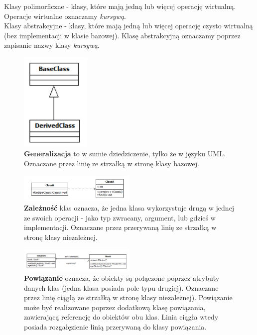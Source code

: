 \documentclass[a4paper,12pt,oneside]{book}
\begin{document}
                Klasy polimorficzne - klasy, które mają jedną lub więcej operację wirtualną. Operacje wirtualne oznaczamy \textit{kursywą}.\\
                Klasy abstrakcyjne - klasy, które mają jedną lub więcej operację czysto wirtualną (bez implementacji w klasie bazowej). Klasę abstrakcyjną oznaczamy poprzez zapisanie nazwy klasy \textit{kursywą}.\\
                \begin{figure}[H]
                    \centering
                    \includegraphics[width=0.3\textwidth]{images/class_inheritance.jpg}
                    \caption{\textbf{Generalizacja} to w sumie dziedziczenie, tylko że w języku UML. Oznaczane przez linię ze strzałką w stronę klasy bazowej.}
                    \label{fig:twojastara35}
                \end{figure}
                \begin{figure}[H]
                    \centering
                    \includegraphics[width=0.5\textwidth]{images/class_zal.jpg}
                    \caption{\textbf{Zależność} klas oznacza, że jedna klasa wykorzystuje drugą w jednej ze swoich operacji - jako typ zwracany, argument, lub gdzieś w implementacji. Oznaczane przez przerywaną linię ze strzałką w stronę klasy niezależnej.}
                    \label{fig:twojastara36}
                \end{figure}
                \begin{figure}[H]
                    \centering
                    \includegraphics[width=0.5\textwidth]{images/class_powiazanie.jpg}
                    \caption{\textbf{Powiązanie} oznacza, że obiekty są połączone poprzez atrybuty danych klas (jedna klasa posiada pole typu drugiej). Oznaczane przez linię ciągłą ze strzałką w stronę klasy niezależnej). Powiązanie może być realizowane poprzez dodatkową klasę powiązania, zawierającą referencję do obiektów obu klas. Linia ciągła wtedy posiada rozgałęzienie linią przerywaną do klasy powiązania.}
                    \label{fig:twojastara37}
                \end{figure}
\end{document}
